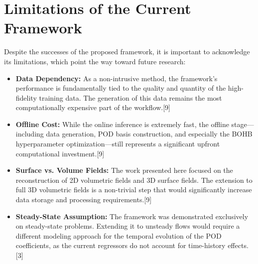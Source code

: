 \documentclass[12pt, a4paper]{report}
\begin{document}
\section{Limitations of the Current Framework}
Despite the successes of the proposed framework, it is important to acknowledge its limitations, which point the way toward future research:
\begin{itemize}
    \item \textbf{Data Dependency:} As a non-intrusive method, the framework's performance is fundamentally tied to the quality and quantity of the high-fidelity training data. The generation of this data remains the most computationally expensive part of the workflow.[9]
    \item \textbf{Offline Cost:} While the online inference is extremely fast, the offline stage—including data generation, POD basis construction, and especially the BOHB hyperparameter optimization—still represents a significant upfront computational investment.[9]
    \item \textbf{Surface vs. Volume Fields:} The work presented here focused on the reconstruction of 2D volumetric fields and 3D surface fields. The extension to full 3D volumetric fields is a non-trivial step that would significantly increase data storage and processing requirements.[9]
    \item \textbf{Steady-State Assumption:} The framework was demonstrated exclusively on steady-state problems. Extending it to unsteady flows would require a different modeling approach for the temporal evolution of the POD coefficients, as the current regressors do not account for time-history effects.[3]
\end{itemize}
\end{document}
